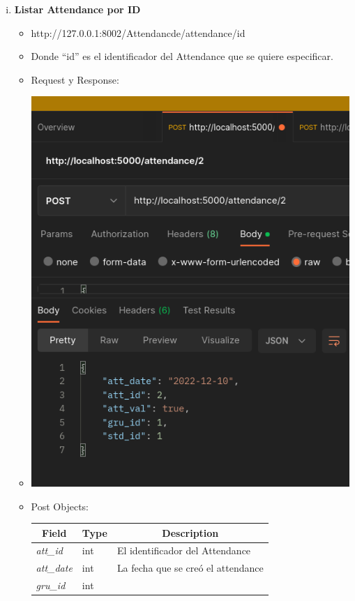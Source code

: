 \documentclass{article}
\begin{document}
\begin{enumerate}[i.]
    \item \textbf{Listar Attendance por ID}
    \begin{itemize}
        \item http://127.0.0.1:8002/Attendancde/attendance/id
        \item Donde ``id'' es el identificador del Attendance que se
        quiere especificar.
        \item Request y Response:
        \item \includegraphics[scale=.5]{assets/attendance/atendance2.png}
        \item Post Objects:
        \begin{table}[H] \centering \begin{tabular}{|l|l|l|} \hline
        \multicolumn{1}{|c|}{\textbf{Field}} &
        \multicolumn{1}{c|}{\textbf{Type}} &
        \multicolumn{1}{c|}{\textbf{Description}} \\ \hline \textit{att\_id} &
        int & El identificador del Attendance \\ \hline \textit{att\_date} & int
        & La fecha que se creó el attendance \\ \hline \textit{gru\_id} & int &

\end{tabular}
\end{table}
\end{itemize}
\end{enumerate}
\end{document}
